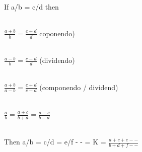\documentclass{article}
\begin{document}
\noindent \\   If a/b = c/d then

\noindent \\   $ \frac{a+b}{b} = \frac{c+d}{d} $ coponendo)


\noindent \\   $ \frac{a-b}{b} = \frac{c-d}{d} $     (dividendo)


\noindent \\   $ \frac{a+b}{a-b} = \frac{c+d}{c-d} $ (componendo / dividend)

\noindent \\   $ \frac{a}{b} = \frac{a+c}{b+d} = \frac{a-c}{b-d}$

\noindent  \\  Then a/b = c/d = e/f - - = K = $ \frac{a+c+e--}{b+d+f--} $

\noindent 
\end{document}
